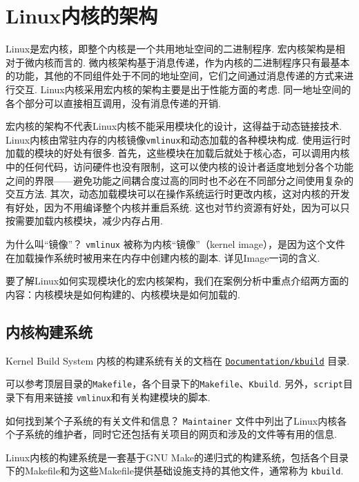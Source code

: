 \section{Linux内核的架构}
Linux是宏内核，即整个内核是一个共用地址空间的二进制程序.
宏内核架构是相对于微内核而言的.
微内核架构基于消息传递，作为内核的二进制程序只有最基本的功能，其他的不同组件处于不同的地址空间，它们之间通过消息传递的方式来进行交互.
Linux内核采用宏内核的架构主要是出于性能方面的考虑.\cite{silberschatz2021operating}
同一地址空间的各个部分可以直接相互调用，没有消息传递的开销.

宏内核的架构不代表Linux内核不能采用模块化的设计，这得益于动态链接技术.
Linux内核由常驻内存的内核镜像\lstinline{vmlinux}和动态加载的各种模块构成.
使用运行时加载的模块的好处有很多.
首先，这些模块在加载后就处于核心态，可以调用内核中的任何代码，访问硬件也没有限制，这可以使内核的设计者适度地划分各个功能之间的界限——避免功能之间耦合度过高的同时也不必在不同部分之间使用复杂的交互方法.
其次，动态加载模块可以在操作系统运行时更改内核，这对内核的开发有好处，因为不用编译整个内核并重启系统.
这也对节约资源有好处，因为可以只按需要加载内核模块，减少内存占用.

\begin{qbox}{为什么叫“镜像”？}
	\lstinline{vmlinux} 被称为内核“镜像”（kernel image），是因为这个文件在加载操作系统时被用来在内存中创建内核的副本.
	详见Image一词的含义\cite{imageWik70:online}.
\end{qbox}

要了解Linux如何实现模块化的宏内核架构，我们在案例分析中重点介绍两方面的内容：内核模块是如何构建的、内核模块是如何加载的.

\subsection{内核构建系统} \label{kbuild}
\begin{readsrcbox}{Kernel Build System}
	内核的构建系统有关的文档在 \href{https://docs.kernel.org/kbuild/index.html}{\lstinline{Documentation/kbuild}} 目录.

	可以参考顶层目录的\lstinline{Makefile}，各个目录下的\lstinline{Makefile}、\lstinline{Kbuild}.
	另外，\lstinline{script}目录下有用来链接 \lstinline{vmlinux}和有关构建模块的脚本.
\end{readsrcbox}
\begin{qbox}{如何找到某个子系统的有关文件和信息？}
	\lstinline{Maintainer} 文件中列出了Linux内核各个子系统的维护者，同时它还包括有关项目的网页和涉及的文件等有用的信息.
\end{qbox}
Linux内核的构建系统是一套基于GNU Make的递归式的构建系统，包括各个目录下的Makefile和为这些Makefile提供基础设施支持的其他文件，通常称为 \lstinline{kbuild}. \cite{LinuxKer71:online}

